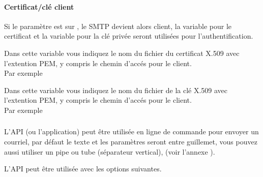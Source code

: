 \paragraph {Certificat/clé client}
\begin {description}


    Si le paramètre est sur , le SMTP devient alors client, la variable
	 pour le certificat et la variable
	 pour la clé privée seront utilisées
	pour l'authentification.


    Dans cette variable vous indiquez le nom du fichier du certificat X.509 avec
	l'extention PEM, y compris le chemin d'accés pour le client. \\
	Par exemple 


    Dans cette variable vous indiquez le nom du fichier de la clé X.509 avec
	l'extention PEM, y compris le chemin d'accés pour le client. \\
	Par exemple 

\end {description}

\subsubsection{}

    L'API (ou l'application)  peut être utilisée
	en ligne de commande pour envoyer un courriel, par défaut le texte et
	les paramètres seront entre guillemet, vous pouvez aussi utiliser un pipe
	ou tube (séparateur vertical), (voir l'annexe ).

    L'API peut être utilisée avec les options suivantes.

